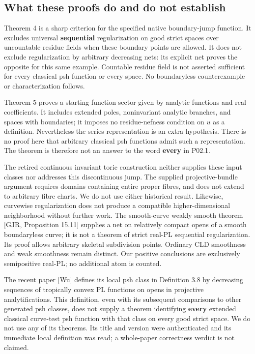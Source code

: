\documentclass[
  11pt,
]{article}
\begin{document}
\subsection{What these proofs do and do not
establish}\label{what-these-proofs-do-and-do-not-establish}

Theorem 4 is a sharp criterion for the specified native boundary-jump
function. It excludes universal \textbf{sequential} regularization on
good strict spaces over uncountable residue fields when these boundary
points are allowed. It does not exclude regularization by arbitrary
decreasing nets: its explicit net proves the opposite for this same
example. Countable residue field is not asserted sufficient for every
classical psh function or every space. No boundaryless counterexample or
characterization follows.

Theorem 5 proves a starting-function sector given by analytic functions
and real coefficients. It includes extended poles, noninvariant analytic
branches, and spaces with boundaries; it imposes no residue-nefness
condition on \(u\) as a definition. Nevertheless the series
representation is an extra hypothesis. There is no proof here that
arbitrary classical psh functions admit such a representation. The
theorem is therefore not an answer to the word \textbf{every} in P02.1.

The retired continuous invariant toric construction neither supplies
these input classes nor addresses this discontinuous jump. The supplied
projective-bundle argument requires domains containing entire proper
fibres, and does not extend to arbitrary fibre charts. We do not use
either historical result. Likewise, curvewise regularization does not
produce a compatible higher-dimensional neighborhood without further
work. The smooth-curve weakly smooth theorem {[}GJR, Proposition
15.11{]} supplies a net on relatively compact opens of a smooth
boundaryless curve; it is not a theorem of strict real-PL sequential
regularization. Its proof allows arbitrary skeletal subdivision points.
Ordinary CLD smoothness and weak smoothness remain distinct. Our
positive conclusions are exclusively semipositive real-PL; no additional
atom is counted.

The recent paper {[}Wu{]} defines its local psh class in Definition 3.8
by decreasing sequences of tropically convex PL functions on opens in
projective analytifications. This definition, even with its subsequent
comparisons to other generated psh classes, does not supply a theorem
identifying \textbf{every} extended classical curve-test psh function
with that class on every good strict space. We do not use any of its
theorems. Its title and version were authenticated and its immediate
local definition was read; a whole-paper correctness verdict is not
claimed.
\end{document}
